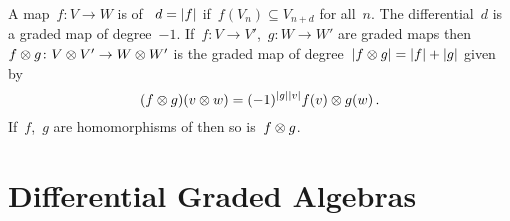 \documentclass[a4paper,10pt,headings=standardclasses]{scrartcl}
\begin{document}
A map~$f \colon V \to W$ is  of ~$d = \lvert f\rvert$ if~$f(V_n) \subseteq V_{n+d}$ for all~$n$.
The differential~$d$ is a graded map of degree~$-1$.
If~$f \colon V \to V'$,~$g \colon W \to W'$ are graded maps then~$f \otimes g \colon V \otimes V' \to W \otimes W'$ is the graded map of degree~$\lvert f \otimes g\rvert = \lvert f\rvert + \lvert g\rvert$ given by
\[
  (f \otimes g)(v \otimes w)
  =
  (-1)^{\lvert g\rvert \lvert v\rvert}
  f(v) \otimes g(w) \,.
\]
If~$f$,~$g$ are homomorphisms of {\dgvs} then so is~$f \otimes g$.







\section{Differential Graded Algebras}
\end{document}
